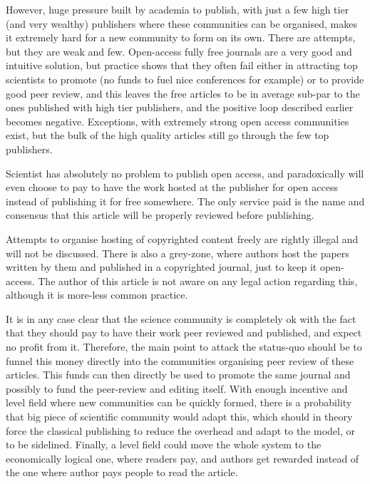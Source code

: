 \documentclass[12pt, a4paper]{article}
\begin{document}
However, huge pressure built by academia to publish, with just a few high tier (and very wealthy) publishers where these communities can be organised, makes it extremely hard for a new community to form on its own. There are attempts, but they are weak and few. Open-access fully free journals are a very good and intuitive solution, but practice shows that they often fail either in attracting top scientists to promote (no funds to fuel nice conferences for example) or to provide good peer review, and this leaves the free articles to be in average sub-par to the ones published with high tier publishers, and the positive loop described earlier becomes negative. Exceptions, with extremely strong open access communities exist, but the bulk of the high quality articles still go through the few top publishers. 

Scientist has absolutely no problem to publish open access, and paradoxically will even choose to pay to have the work hosted at the publisher for open access instead of publishing it for free somewhere. The only service paid is the name and consensus that this article will be properly reviewed before publishing. 

Attempts to organise hosting of copyrighted content freely are rightly illegal \cite{nature-1} and will not be discussed. There is also a grey-zone, where authors host the papers written by them and published in a copyrighted journal, just to keep it open-access. The author of this article is not aware on any legal action regarding this, although it is more-less common practice.

It is in any case clear that the science community is completely ok with the fact that they should pay to have their work peer reviewed and published, and expect no profit from it. Therefore, the main point to attack the status-quo should be to funnel this money directly into the communities organising peer review of these articles. This funds can then directly be used to promote the same journal and possibly to fund the peer-review and editing itself. With enough incentive and level field where new communities can be quickly formed, there is a probability that big piece of scientific community would adapt this, which should in theory force the classical publishing to reduce the overhead and adapt to the model, or to be sidelined. Finally, a level field could move the whole system to the economically logical one, where readers pay, and authors get rewarded instead of the one where author pays people to read the article.
\end{document}
